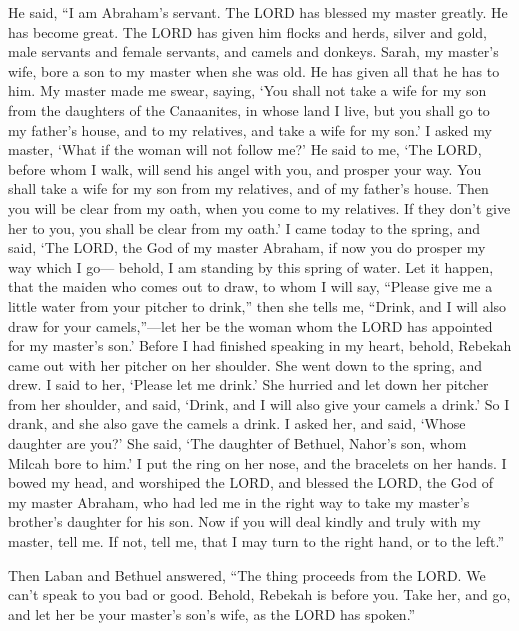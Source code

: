 \myverse{}He said, “I am Abraham’s servant. \myverse{}The LORD has blessed my master greatly. He has become great. The LORD has given him flocks and herds, silver and gold, male servants and female servants, and camels and donkeys. \myverse{}Sarah, my master’s wife, bore a son to my master when she was old. He has given all that he has to him. \myverse{}My master made me swear, saying, ‘You shall not take a wife for my son from the daughters of the Canaanites, in whose land I live, \myverse{}but you shall go to my father’s house, and to my relatives, and take a wife for my son.’ \myverse{}I asked my master, ‘What if the woman will not follow me?’ \myverse{}He said to me, ‘The LORD, before whom I walk, will send his angel with you, and prosper your way. You shall take a wife for my son from my relatives, and of my father’s house. \myverse{}Then you will be clear from my oath, when you come to my relatives. If they don’t give her to you, you shall be clear from my oath.’ \myverse{}I came today to the spring, and said, ‘The LORD, the God of my master Abraham, if now you do prosper my way which I go— \myverse{}behold, I am standing by this spring of water. Let it happen, that the maiden who comes out to draw, to whom I will say, “Please give me a little water from your pitcher to drink,” \myverse{}then she tells me, “Drink, and I will also draw for your camels,”—let her be the woman whom the LORD has appointed for my master’s son.’ \myverse{}Before I had finished speaking in my heart, behold, Rebekah came out with her pitcher on her shoulder. She went down to the spring, and drew. I said to her, ‘Please let me drink.’ \myverse{}She hurried and let down her pitcher from her shoulder, and said, ‘Drink, and I will also give your camels a drink.’ So I drank, and she also gave the camels a drink. \myverse{}I asked her, and said, ‘Whose daughter are you?’ She said, ‘The daughter of Bethuel, Nahor’s son, whom Milcah bore to him.’ I put the ring on her nose, and the bracelets on her hands. \myverse{}I bowed my head, and worshiped the LORD, and blessed the LORD, the God of my master Abraham, who had led me in the right way to take my master’s brother’s daughter for his son. \myverse{}Now if you will deal kindly and truly with my master, tell me. If not, tell me, that I may turn to the right hand, or to the left.”

\myverse{}Then Laban and Bethuel answered, “The thing proceeds from the LORD. We can’t speak to you bad or good. \myverse{}Behold, Rebekah is before you. Take her, and go, and let her be your master’s son’s wife, as the LORD has spoken.”

